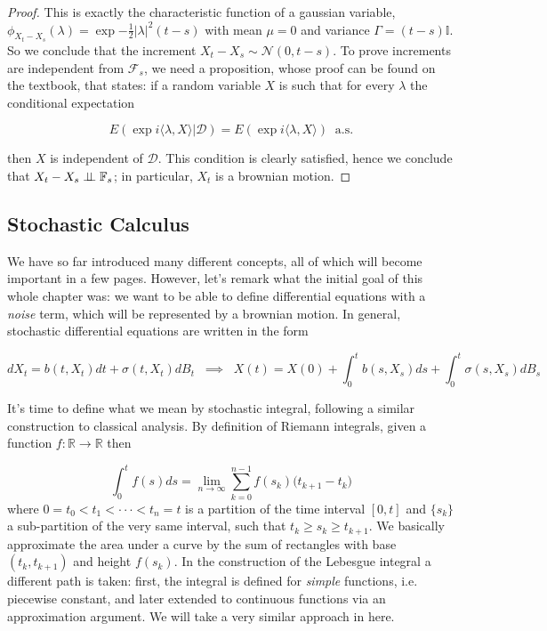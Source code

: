\begin{proof}
    This is exactly the characteristic function of a gaussian variable, $\phi_{X_t-X_s}(\lambda) = \exp{-\frac{1}{2}\vert \lambda \vert^2 (t-s)}$ with mean $\mu = 0$ and variance $\Gamma = (t-s)\mathbb{I}$. So we conclude that the increment $X_t - X_s \sim \mathcal{N}(0,t-s)$. To prove increments are independent from $\mathcal{F}_s$, we need a proposition, whose proof can be found on the textbook, that states: if a random variable $X$ is such that for every $\lambda$ the conditional expectation

    \begin{equation*}
        E(\exp{i \langle \lambda, X \rangle } \vert \mathcal{D}) = E(\exp{i \langle \lambda, X \rangle}) \;\; \text{a.s.}
    \end{equation*}

    then $X$ is independent of $\mathcal{D}$. This condition is clearly satisfied, hence we conclude that $X_t-X_s \perp \!\!\! \perp \mathbb{F}_s$; in particular, $X_t$ is a brownian motion. 
\end{proof}

\subsection{Stochastic Calculus}
We have so far introduced many different concepts, all of which will become important in a few pages. However, let's remark what the initial goal of this whole chapter was: we want to be able to define differential equations with a \textit{noise} term, which will be represented by a brownian motion. In general, stochastic differential equations are written in the form

\begin{equation*}
    d X_t = b(t,X_t)dt + \sigma(t,X_t) dB_t \;\; \implies \;\; X(t) = X(0) + \int_0^t b(s,X_s) ds + \int_0^t \sigma(s,X_s) dB_s
\end{equation*}

It's time to define what we mean by stochastic integral, following a similar construction to classical analysis. By definition of Riemann integrals, given a function $f : \mathbb{R} \to \mathbb{R}$ then

\begin{equation*}
    \int_0^t f(s) ds = \lim_{n \to \infty} \sum_{k=0}^{n-1} f(s_k) \big( t_{k+1} - t_k)
\end{equation*}
where $0 = t_0 < t_1 < \cdot\cdot\cdot < t_n = t$ is a partition of the time interval $[0,t]$ and $\{s_k\}$ a sub-partition of the very same interval, such that $t_k \geq s_k \geq t_{k+1}$. We basically approximate the area under a curve by the sum of rectangles with base $(t_k,t_{k+1})$ and height $f(s_k)$. In the construction of the Lebesgue integral a different path is taken: first, the integral is defined for \textit{simple} functions, i.e. piecewise constant, and later extended to continuous functions via an approximation argument. We will take a very similar approach in here. 


